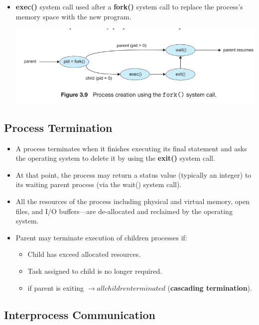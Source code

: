 \documentclass[10pt]{article}
\newcommand{\tf}{\textbf}
\newcommand{\rarrow}{\rightarrow}
\begin{document}
\begin{itemize}
	\item \tf{exec()} system call used after a \tf{fork()} system call to replace the process's memory space with the new program.
	
	\bigbreak
	\includegraphics[scale = 0.7]{fork_exec.png}
	\bigbreak
\end{itemize}

\subsection{Process Termination}

\begin{itemize}
	\item A process terminates when it finishes executing its final statement and asks the operating system to delete it by using the \tf{exit()} system call. 
	\item At that point, the process may return a status value (typically an integer) to its waiting parent process (via the wait() system call).
	\item All the resources of the process including physical and virtual memory, open files, and I/O buffers—are de-allocated and reclaimed by the operating system.
	\item Parent may terminate execution of children processes if: 
	\begin{itemize}
		\item Child has exceed allocated resources.
		\item Task assigned to child is no longer required.
		\item if parent is exiting $\rarrow all children terminated$ (\tf{cascading termination}).
	\end{itemize}
\end{itemize}

\subsection{Interprocess Communication}
\end{document}

